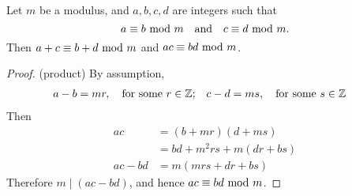 \begin{proposition}\label{modps}
Let $m$ be a modulus, and $a,b,c,d$ are integers such that
\[a\equiv b\text{ mod }{m} \quad \text{and} \quad c\equiv d\text{ mod }{m}.\]
Then $a+c \equiv b+d\text{ mod }{m}$ and $ac \equiv bd\text{ mod }{m}$.
\end{proposition}
\begin{proof}
(product) By assumption, 
\begin{align*}
a-b &= mr,\quad \text{for some $r\in \mathbb Z$}; & c-d &= ms,\quad \text{for some $s\in \mathbb Z$}
\end{align*}
Then 
\begin{align*}
ac &= (b+mr)(d+ms)\\[0.5em]
&= bd + m^2rs + m(dr + bs)\\[0.5em]
ac - bd &= m(mrs + dr + bs)
\end{align*}
Therefore $m\mid (ac-bd)$, and hence $ac\equiv bd \text{ mod }{m}$.
\end{proof}

\vspace*{1em}

